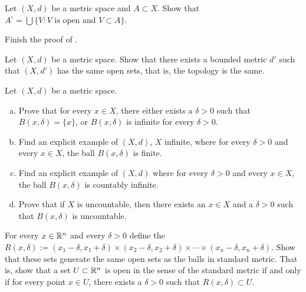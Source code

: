 \begin{exercise}
Let $(X,d)$ be a metric space and $A \subset X$.  Show that
$A^\circ = \bigcup \{ V : V \text{ is open and } V \subset A \}$.
\end{exercise}

\begin{exercise}
Finish the proof of .
\end{exercise}

\begin{exercise}
Let $(X,d)$ be a metric space.  Show that there exists a bounded metric
$d'$ such that $(X,d')$ has the same open sets, that is, the topology is
the same.
\end{exercise}

\begin{samepage}
\begin{exercise}
Let $(X,d)$ be a metric space.
\begin{enumerate}[a)]
\item
Prove that for every $x \in X$, there either exists a $\delta > 0$ such that
$B(x,\delta) = \{ x \}$, or $B(x,\delta)$ is infinite for every $\delta >  0$.
\item
Find an explicit example of $(X,d)$, $X$ infinite, where
for every $\delta > 0$ and
every $x \in X$, the
ball $B(x,\delta)$ is finite.
\item
Find an explicit example of $(X,d)$ where for every $\delta > 0$ and
every $x \in X$, the
ball $B(x,\delta)$ is countably infinite.
\item
Prove that if $X$ is uncountable, then there exists
an $x \in X$ and a $\delta > 0$ such that $B(x,\delta)$ is uncountable.
\end{enumerate}
\end{exercise}
\end{samepage}

\begin{exercise}
For every $x \in {\mathbb{R}}^n$ and every $\delta > 0$ define the 
$R(x,\delta) :=
(x_1-\delta,x_1+\delta) \times
(x_2-\delta,x_2+\delta) \times \cdots \times
(x_n-\delta,x_n+\delta)$.  Show that these sets generate the same open
sets as the balls in standard metric.  That is, show that a set $U \subset {\mathbb{R}}^n$
is open in the sense of the standard metric if and only if for every
point $x \in U$, there exists a $\delta > 0$ such that $R(x,\delta) \subset
U$.
\end{exercise}


